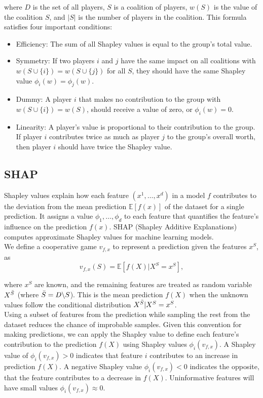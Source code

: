 where $D$ is the set of all players, $S$ is a coalition of players, $w(S)$ is the value of the coalition $S$, and $|S|$ is the number of players in the coalition.
This formula satisfies four important conditions:
\begin{itemize}
    \item Efficiency: The sum of all Shapley values is equal to the group's total value.
    \item Symmetry: If two players $i$ and $j$ have the same impact on all coalitions with $w(S \cup \{i\}) = w(S \cup \{j\})$ for all $S$, they should have the same Shapley value $\phi_i(w) = \phi_j(w)$.
    \item Dummy: A player $i$ that makes no contribution to the group with $w(S \cup \{i\}) = w(S)$, should receive a value of zero, or $\phi_i(w)=0$.
    \item Linearity: A player's value is proportional to their contribution to the group.
If player $i$ contributes twice as much as player $j$ to the group's overall worth, then player $i$ should have twice the Shapley value.
\end{itemize}

\subsection{SHAP}
Shapley values explain how each feature $(x^1, \dots, x^d)$ in a model $f$ contributes to the deviation from the mean prediction $\mathbb{E}[f(x)]$ of the dataset for a single prediction.
It assigns a value $\phi_1, \dots, \phi_d$ to each feature that quantifies the feature's influence on the prediction $f(x)$.
SHAP (Shapley Additive Explanations) computes approximate Shapley values for machine learning models.\\

We define a cooperative game $v_{f,x}$ to represent a prediction given the features $x^S$, as
\begin{equation}
    v_{f,x}(S) = \mathbb{E} \left[ f(X) | X^S = x^S \right],
\end{equation}

where $x^S$ are known, and the remaining features are treated as random variable $X^{\Bar{S}}$ (where $\Bar{S} = D \backslash S$).
This is the mean prediction $f(X)$ when the unknown values follow the conditional distribution $X^{\Bar{S}} | X^S = x^S$.\\

Using a subset of features from the prediction while sampling the rest from the dataset reduces the chance of improbable samples.
Given this convention for making predictions, we can apply the Shapley value to define each feature's contribution to the prediction $f(X)$ using Shapley values $\phi_i(v_{f,x})$.
A Shapley value of $\phi_i(v_{f,x}) > 0$ indicates that feature $i$ contributes to an increase in prediction $f(X)$.
A negative Shapley value $\phi_i(v_{f,x}) < 0$ indicates the opposite, that the feature contributes to a decrease in $f(X)$.
Uninformative features will have small values $\phi_i(v_{f,x}) \approx 0$.

